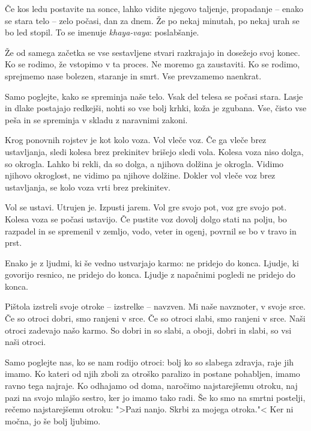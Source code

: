 \clearpage


Če kos ledu postavite na sonce, lahko vidite njegovo taljenje, propadanje – enako se stara telo – zelo počasi, dan za dnem. Že po nekaj minutah, po nekaj urah se bo led stopil. To se imenuje \emph{khaya-vaya}: poslabšanje.

Že od samega začetka se vse sestavljene stvari razkrajajo in dosežejo svoj konec. Ko se rodimo, že vstopimo v ta proces. Ne moremo ga zaustaviti. Ko se rodimo, sprejmemo nase bolezen, staranje in smrt. Vse prevzamemo naenkrat.

Samo poglejte, kako se spreminja naše telo. Vsak del telesa se počasi stara. Lasje  in dlake postajajo redkejši, nohti so vse bolj krhki, koža je zgubana. Vse, čisto vse peša in se spreminja v skladu z naravnimi zakoni.

\clearpage


Krog ponovnih rojstev je kot kolo voza. Vol vleče voz. Če ga vleče brez ustavljanja, sledi kolesa brez prekinitev brišejo sledi vola. Kolesa voza niso dolga, so okrogla. Lahko bi rekli, da so dolga, a njihova dolžina je okrogla. Vidimo njihovo okroglost, ne vidimo pa njihove dolžine. Dokler vol vleče voz brez ustavljanja, se kolo voza vrti brez prekinitev.

Vol se ustavi. Utrujen je. Izpusti jarem. Vol gre svojo pot, voz gre svojo pot. Kolesa voza se počasi ustavijo. Če pustite voz dovolj dolgo stati na polju, bo razpadel in se spremenil v zemljo, vodo, veter in ogenj, povrnil se bo v travo in prst.

Enako je z ljudmi, ki še vedno ustvarjajo karmo: ne pridejo do konca. Ljudje, ki govorijo resnico, ne pridejo do konca. Ljudje z napačnimi pogledi ne pridejo do konca.

\clearpage


Pištola izstreli svoje otroke – izstrelke – navzven. Mi naše navznoter, v svoje srce. Če so otroci dobri, smo ranjeni v srce. Če so otroci slabi, smo ranjeni v srce. Naši otroci zadevajo našo karmo. So dobri in so slabi, a oboji, dobri in slabi, so vsi naši otroci.

Samo poglejte nas, ko se nam rodijo otroci: bolj ko so slabega zdravja, raje jih imamo. Ko kateri od njih zboli za otroško paralizo in postane pohabljen, imamo ravno tega najraje. Ko odhajamo od doma, naročimo najstarejšemu otroku, naj pazi na svojo mlajšo sestro, ker jo imamo tako radi. Še ko smo na smrtni postelji, rečemo najstarejšemu otroku: ">Pazi nanjo. Skrbi za mojega otroka."< Ker ni močna, jo še bolj ljubimo.

